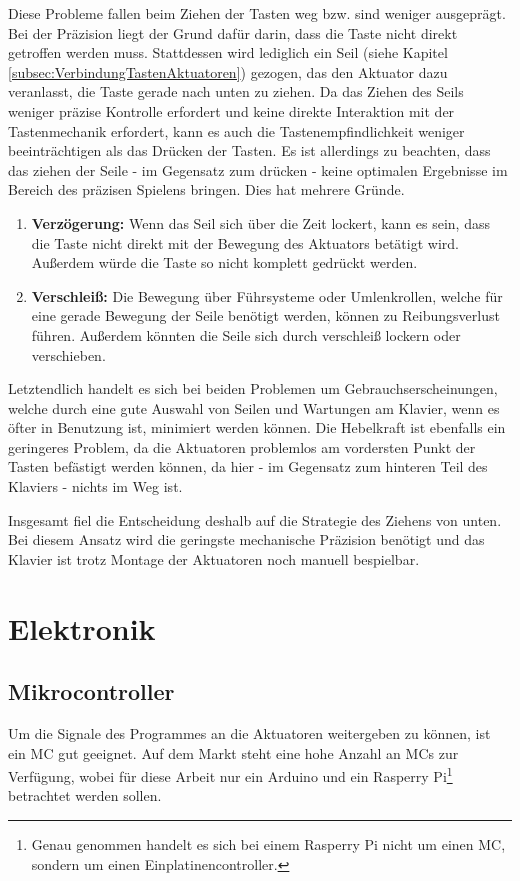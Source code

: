 Diese Probleme fallen beim Ziehen der Tasten weg bzw. sind weniger ausgeprägt.
Bei der Präzision liegt der Grund dafür darin, dass die Taste nicht
direkt getroffen werden muss. Stattdessen wird lediglich ein Seil (siehe Kapitel \ref{subsec:VerbindungTastenAktuatoren})
gezogen, das den Aktuator dazu veranlasst, die Taste
gerade nach unten zu ziehen.
Da das Ziehen des Seils weniger präzise Kontrolle erfordert
und keine direkte Interaktion mit der Tastenmechanik erfordert, kann es auch die Tastenempfindlichkeit weniger beeinträchtigen
als das Drücken der Tasten. Es ist allerdings zu beachten, dass das ziehen der Seile - im Gegensatz zum drücken - keine
optimalen Ergebnisse im Bereich des präzisen Spielens bringen. Dies hat mehrere Gründe.
\begin{enumerate}
	\item \textbf{Verzögerung:} Wenn das Seil sich über die Zeit lockert, kann es sein, dass die Taste nicht direkt mit der Bewegung des Aktuators betätigt wird. Außerdem würde die Taste so nicht komplett gedrückt werden.
	\item \textbf{Verschleiß:} Die Bewegung über Führsysteme oder Umlenkrollen, welche für eine gerade Bewegung der Seile benötigt werden, können zu Reibungsverlust führen. Außerdem könnten die Seile sich durch verschleiß lockern oder verschieben.
\end{enumerate}
Letztendlich handelt es sich bei beiden Problemen um Gebrauchserscheinungen, welche durch eine gute Auswahl von Seilen
und Wartungen am Klavier, wenn es öfter in Benutzung ist, minimiert werden können.
Die Hebelkraft ist ebenfalls ein geringeres Problem, da die Aktuatoren problemlos am vordersten Punkt der Tasten
befästigt werden können, da hier - im Gegensatz zum hinteren Teil des Klaviers - nichts im Weg ist.

Insgesamt fiel die Entscheidung deshalb auf die Strategie des Ziehens von unten.
Bei diesem Ansatz wird die geringste mechanische Präzision benötigt und das Klavier ist trotz Montage der Aktuatoren noch manuell bespielbar.

\section{Elektronik}\label{sec:konzeptionhw-elektronik}

\subsection{Mikrocontroller}\label{Ansteuerung}
Um die Signale des Programmes an die Aktuatoren weitergeben zu können, ist ein \acf{MC} gut geeignet.
Auf dem Markt steht eine hohe Anzahl an \ac{MC}s zur Verfügung,
wobei für diese Arbeit nur ein Arduino und ein Rasperry Pi\footnote{Genau genommen handelt es sich bei einem Rasperry Pi nicht um einen \ac{MC}, sondern um einen Einplatinencontroller.} betrachtet werden sollen.

